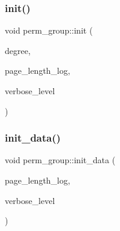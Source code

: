 \mbox{\label{classperm__group_aefb07e1e34c09ec498ca1ae072520b48}} 
\subsubsection{\texorpdfstring{init()}{init()}}
{\footnotesize\ttfamily void perm\+\_\+group\+::init (\begin{DoxyParamCaption}\item[{\mbox{\hyperlink{galois_8h_a09fddde158a3a20bd2dcadb609de11dc}{I\+NT}}}]{degree,  }\item[{\mbox{\hyperlink{galois_8h_a09fddde158a3a20bd2dcadb609de11dc}{I\+NT}}}]{page\+\_\+length\+\_\+log,  }\item[{\mbox{\hyperlink{galois_8h_a09fddde158a3a20bd2dcadb609de11dc}{I\+NT}}}]{verbose\+\_\+level }\end{DoxyParamCaption})}

\mbox{\label{classperm__group_abbcdd66714f6c380e6343d12592f0745}} 
\subsubsection{\texorpdfstring{init\+\_\+data()}{init\_data()}}
{\footnotesize\ttfamily void perm\+\_\+group\+::init\+\_\+data (\begin{DoxyParamCaption}\item[{\mbox{\hyperlink{galois_8h_a09fddde158a3a20bd2dcadb609de11dc}{I\+NT}}}]{page\+\_\+length\+\_\+log,  }\item[{\mbox{\hyperlink{galois_8h_a09fddde158a3a20bd2dcadb609de11dc}{I\+NT}}}]{verbose\+\_\+level }\end{DoxyParamCaption})}

\mbox{\label{classperm__group_ab7716a70d704336a7d895261c902a6bf}} 
